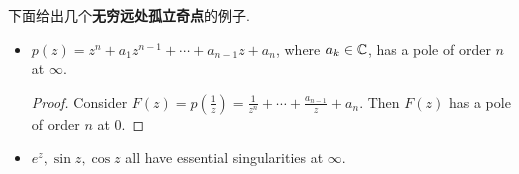 	\vspace{2em}
	\begin{example}\label{ex 8.6.2}
		下面给出几个\textbf{无穷远处孤立奇点}的例子.
		\begin{itemize}
			\item $p(z) = z^n + a_1 z^{n - 1} + \cdots + a_{n - 1}z + a_n$, where $a_k \in \mathbb{C}$, has a pole of order $n$ at $\infty$.
			
			\vspace{1em}
			\begin{proof}
				Consider $F(z) = p(\frac{1}{z}) = \frac{1}{z^n} + \cdots + \frac{a_{n - 1}}{z} + a_n$. Then $F(z)$ has a pole of order $n$ at $0$.
			\end{proof}
		
			\vspace{2em}
			
			\item $e^z , \sin{z} , \cos{z}$ all have essential singularities at $\infty$.
		\end{itemize}
	\end{example}

\vspace{2em}
